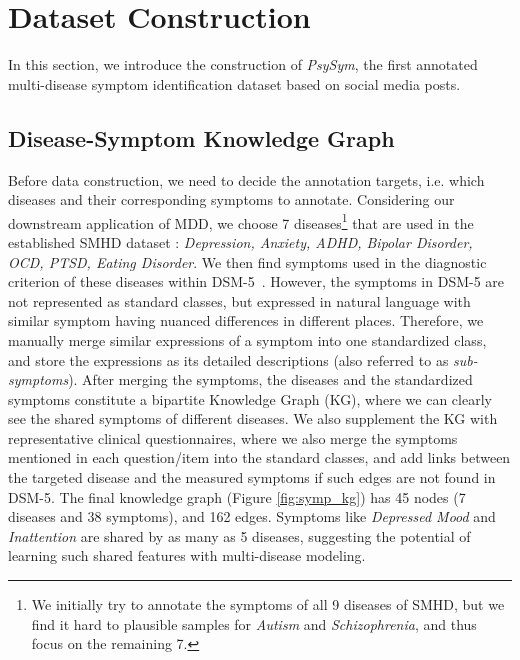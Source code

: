 \section{Dataset Construction}
In this section, we introduce the construction of \textit{PsySym}, the first annotated multi-disease symptom identification dataset based on social media posts.

\subsection{Disease-Symptom Knowledge Graph}
\label{sec:kg}

Before data construction, we need to decide the annotation targets, i.e. which diseases and their corresponding symptoms to annotate. Considering our downstream application of MDD, we choose 7 diseases\footnote{We initially try to annotate the symptoms of all 9 diseases of SMHD, but we find it hard to plausible samples for \textit{Autism} and \textit{Schizophrenia}, and thus focus on the remaining 7.} that are used in the established SMHD dataset \citep{cohan2018smhd}: \textit{Depression, Anxiety, ADHD, Bipolar Disorder, OCD, PTSD, Eating Disorder}. We then find symptoms used in the diagnostic criterion of these diseases within DSM-5~\citep{american2013diagnostic}. However, the symptoms in DSM-5 are not represented as standard classes, but expressed in natural language with similar symptom having nuanced differences in different places. Therefore, we manually merge similar expressions of a symptom into one standardized class, and store the expressions as its detailed descriptions (also referred to as \textit{sub-symptoms}). After merging the symptoms, the diseases and the standardized symptoms constitute a bipartite Knowledge Graph (KG), where we can clearly see the shared symptoms of different diseases. We also supplement the KG with representative clinical questionnaires, where we also merge the symptoms mentioned in each question/item into the standard classes, and add links between the targeted disease and the measured symptoms if such edges are not found in DSM-5. The final knowledge graph (Figure \ref{fig:symp_kg}) has 45 nodes (7 diseases and 38 symptoms), and 162 edges. Symptoms like \textit{Depressed Mood} and \textit{Inattention} are shared by as many as 5 diseases, suggesting the potential of learning such shared features with multi-disease modeling. 

